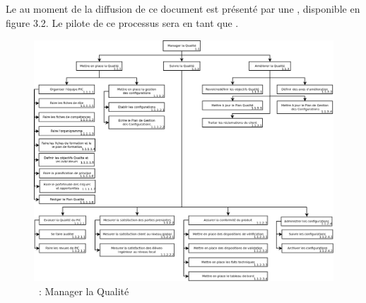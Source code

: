 \subsection{\WBSCourt{}}
Le \SMQ{} au moment de la diffusion de ce document est présenté par une \WBSCourt, disponible en figure 3.2.
Le pilote de ce processus sera \Pierre{} en tant que \RQ{}.
\newpage
\begin{figure}[H]
\centering
 \includegraphics[width=23cm,angle=90]{images/manager_qualite.png}
 \caption{\WBSCourt{}~: Manager la Qualité}
 \label{WBS2}
\end{figure}

